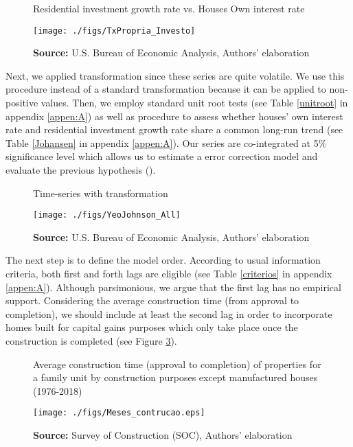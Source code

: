 \begin{figure}[htb]
	\centering
	\caption{Residential investment growth rate vs. Houses Own interest rate}
	\label{propria_investo}
	\texttt{[image: ./figs/TxPropria\_Investo]}
	\caption*{\textbf{Source:} U.S. Bureau of Economic Analysis, Authors' elaboration}
\end{figure}




Next, we applied \textcite{yeo_new_2000} transformation since these series are quite volatile. We use this procedure instead of a standard \textcite{box_analysis_1964} transformation  because it can be applied to non-positive values. 
Then, we employ standard unit root tests (see Table \ref{unitroot} in appendix \ref{appen:A}) as well as \textcite{johansen_estimation_1991} procedure to assess whether houses' own interest rate and residential investment growth rate share a common long-run trend (see Table \ref{Johansen} in appendix \ref{appen:A}).
Our series are co-integrated at 5\% significance level which allows us to estimate a error correction model and evaluate the previous hypothesis (\cite{enders_applied_2014}).

\begin{figure}[htb]
	\centering
	\caption{Time-series with \textcite{yeo_new_2000} transformation}
	\label{YeoJhonson}
	\texttt{[image: ./figs/YeoJohnson\_All]}
	\caption*{\textbf{Source:} U.S. Bureau of Economic Analysis, Authors' elaboration}
\end{figure}


The next step is to define the model order. According to usual information criteria, both first and forth lags are eligible (see Table \ref{criterios} in appendix \ref{appen:A}).
Although parsimonious, we argue that the first lag has no empirical support.
Considering the average construction time (from approval to completion), we should include at least the second lag in order to incorporate homes built for capital gains purposes which only take place once the construction is completed (see Figure \ref{meses}).

\begin{figure}[H]
	\centering
	\caption{Average construction time (approval to completion) of properties for a family unit by construction purposes except manufactured houses (1976-2018)}
	\label{meses}
	\texttt{[image: ./figs/Meses\_contrucao.eps]}
	\caption*{\textbf{Source:} Survey of Construction (SOC), Authors' elaboration}
\end{figure}

